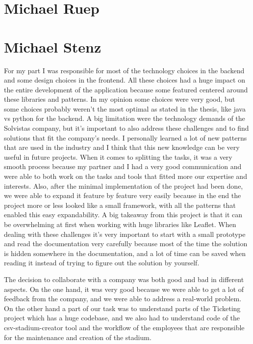 \section{Michael Ruep}
\section{Michael Stenz}
For my part I was responsible for most of the technology choices in the backend and some design choices in the frontend. All these choices had a huge impact on the entire development of the application because some featured centered around these libraries and patterns. In my opinion some choices were very good, but some choices probably weren't the most optimal as stated in the thesis, like java vs python for the backend. A big limitation were the technology demands of the Solvistas company, but it's important to also address these challenges and to find solutions that fit the company's needs. I personally learned a lot of new patterns that are used in the industry and I think that this new knowledge can be very useful in future projects. When it comes to splitting the tasks, it was a very smooth process because my partner and I had a very good communication and were able to both work on the tasks and tools that fitted more our expertise and interests. Also, after the minimal implementation of the project had been done, we were able to expand it feature by feature very easily because in the end the project more or less looked like a small framework, with all the patterns that enabled this easy expandability. A big takeaway from this project is that it can be overwhelming at first when working with huge libraries like Leaflet. When dealing with these challenges it's very important to start with a small prototype and read the documentation very carefully because most of the time the solution is hidden somewhere in the documentation, and a lot of time can be saved when reading it instead of trying to figure out the solution by yourself.

The decision to collaborate with a company was both good and bad in different aspects. On the one hand, it was very good because we were able to get a lot of feedback from the company, and we were able to address a real-world problem. On the other hand a part of our task was to understand parts of the Ticketing project which has a huge codebase, and we also had to understand code of the csv-stadium-creator tool and the workflow of the employees that are responsible for the maintenance and creation of the stadium.
